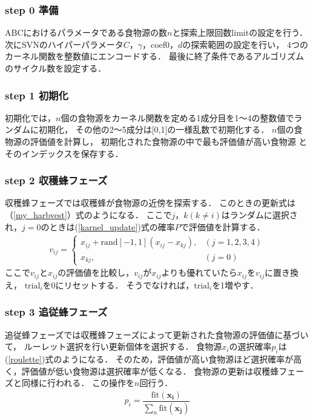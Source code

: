 \subsubsection*{step 0 準備}
ABCにおけるパラメータである食物源の数$n$と探索上限回数limitの設定を行う．
次にSVNのハイパーパラメータ$C$，$\gamma$，coef0，$d$の探索範囲の設定を行い，
4つのカーネル関数を整数値にエンコードする．
最後に終了条件であるアルゴリズムのサイクル数を設定する．
\subsubsection*{step 1 初期化}
初期化では，$n$個の食物源をカーネル関数を定める1成分目を1〜4の整数値でランダムに初期化，
その他の2〜5成分は[0,1]の一様乱数で初期化する．
$n$個の食物源の評価値を計算し，
初期化された食物源の中で最も評価値が高い食物源
とそのインデックスを保存する．
\subsubsection*{step 2 収穫蜂フェーズ}
収穫蜂フェーズでは収穫蜂が食物源の近傍を探索する．
このときの更新式は（\ref{my_harbvest}）式のようになる．
ここで$j，k(k\neq i)$はランダムに選択され，$j=0$のときは(\ref{karnel_update})式の確率$P$で評価値を計算する．
\begin{align}
    \label{my_harbvest}
    v_{ij} = 
    \begin{cases}
    x_{ij} + \mathrm{rand}[-1,1](x_{ij}-x_{kj}), &  (j = 1, 2, 3, 4) \\
    x_{kj}, & (j = 0)
    \end{cases}
\end{align}
ここで$v_{ij}$と$x_{ij}$の評価値を比較し，$v_{ij}$が$x_{ij}$よりも優れていたら$x_{ij}$を$v_{ij}$に置き換え，
$\text{trial}_i$を0にリセットする．
そうでなければ，$\text{trial}_i$を1増やす．
\subsubsection*{step 3 追従蜂フェーズ}
追従蜂フェーズでは収穫蜂フェーズによって更新された食物源の評価値に基づいて，
ルーレット選択を行い更新個体を選択する．
食物源$x_i$の選択確率$p_i$は(\ref{roulette})式のようになる．
そのため，評価値が高い食物源ほど選択確率が高く，評価値が低い食物源は選択確率が低くなる．
食物源の更新は収穫蜂フェーズと同様に行われる．
この操作を$n$回行う．
\begin{align}
    p_i = \dfrac{\mathrm{fit}(\boldsymbol{x_{i}})}{\sum_{n}\mathrm{fit}(\boldsymbol{x_{j}})}
\end{align}
